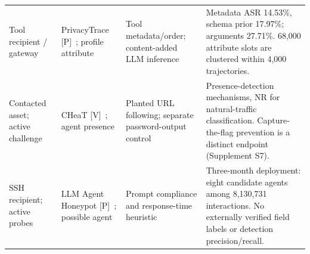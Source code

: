 \begin{table}[t]
\begin{tabularx}{\textwidth}{@{}P{.13\textwidth}P{.18\textwidth}P{.23\textwidth}Y@{}}
Tool recipient / gateway & PrivacyTrace [P]~\cite{duan2026privacytrace}; profile attribute & Tool metadata/order; content-added LLM inference & Metadata ASR 14.53\%, schema prior 17.97\%; arguments 27.71\%. 68,000 attribute slots are clustered within 4,000 trajectories. \\\addlinespace[3pt]
Contacted asset; active challenge & CHeaT [V]~\cite{ayzenshteyn2025cheat}; agent presence & Planted URL following; separate password-output control & Presence-detection mechanisms, NR for natural-traffic classification. Capture-the-flag prevention is a distinct endpoint (Supplement S7). \\\addlinespace[3pt]
SSH recipient; active probes & LLM Agent Honeypot [P]~\cite{reworr2024honeypot}; possible agent & Prompt compliance and response-time heuristic & Three-month deployment: eight candidate agents among 8,130,731 interactions. No externally verified field labels or detection precision/recall. \\\bottomrule
\end{tabularx}\end{table}
